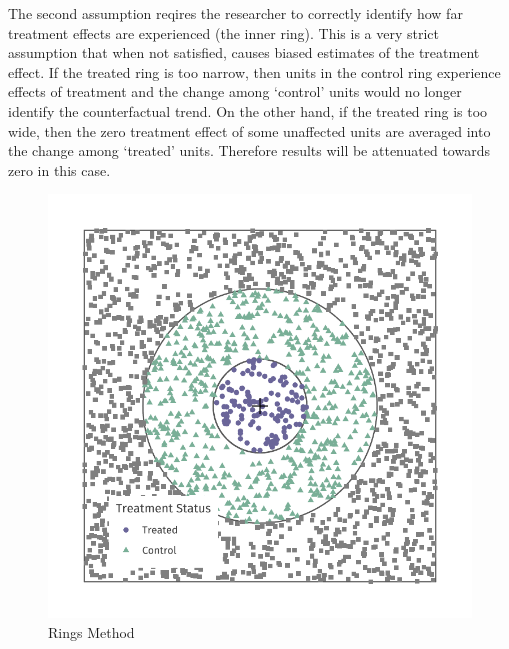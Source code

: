 \documentclass[10pt]{article}
\begin{document}
The second assumption reqires the researcher to correctly identify how far treatment effects are experienced (the inner ring). This is a very strict assumption that when not satisfied, causes biased estimates of the treatment effect. If the treated ring is too narrow, then units in the control ring experience effects of treatment and the change among `control' units would no longer identify the counterfactual trend. On the other hand, if the treated ring is too wide, then the zero treatment effect of some unaffected units are averaged into the change among `treated' units. Therefore results will be attenuated towards zero in this case.



\begin{figure}[tb]
    \caption{Rings Method}
    \label{fig:example-id}

    \begin{adjustbox}{width = 0.4\textwidth, center}
        \includegraphics[width=\textwidth]{../../figures/example_id.pdf}
    \end{adjustbox}
\end{figure}
\end{document}
